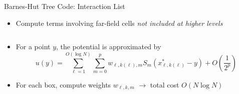 \documentclass{beamer}
\newcommand{\pr}[1]{\left(#1\right)}
\begin{document}
\begin{frame}{Barnes-Hut Tree Code: Interaction List}
  \pause
  \begin{itemize}
  \item Compute terms involving far-field cells \emph{not included at higher levels}
  \pause
  \begin{columns}
    \begin{column}{0.5\textwidth}
      \begin{figure}
        \begin{center}
        \texttt{[image: \{interaction\_list]}.pdf}
        \end{center}
        \label{fig:interaction_list}
        \end{figure}
    \end{column}
    \begin{column}{0.5\textwidth}
      \begin{figure}
        \begin{center}
          }
        \end{center}
      \end{figure}
    \end{column}
  \end{columns}
  \pause
  \item For a point $y$, the potential is approximated by
    \[
    u(y) = \sum_{\ell=1}^{O(\log N)}\sum_{m=0}^p w_{\ell,k(\ell),m} S_m\pr{x_{\ell, k(\ell)}^* - y} + O\pr{\frac{1}{2^p}}
    \]
  \pause
  \item For each box, compute weights $w_{\ell,k,m}$ $\longrightarrow$ total cost $O(N\log N)$
  \end{itemize}

  
\end{frame}
\end{document}
